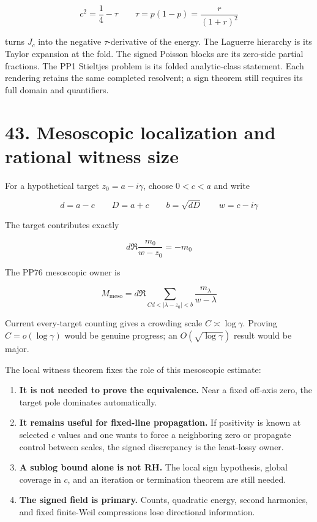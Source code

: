 \documentclass[
  11pt,
]{book}
\providecommand{\tightlist}{%
  \setlength{\itemsep}{0pt}\setlength{\parskip}{0pt}}
\begin{document}
\[
c^2=\frac14-\tau
\qquad
\tau=p(1-p)=\frac{r}{(1+r)^2}
\]

turns \(J_c\) into the negative \(\tau\)-derivative of the energy. The
Laguerre hierarchy is its Taylor expansion at the fold. The signed
Poisson blocks are its zero-side partial fractions. The PP1 Stieltjes
problem is its folded analytic-class statement. Each rendering retains
the same completed resolvent; a sign theorem still requires its full
domain and quantifiers.

\section{43. Mesoscopic localization and rational witness
size}\label{mesoscopic-localization-and-rational-witness-size}

For a hypothetical target \(z_0=a-i\gamma\), choose \(0<c<a\) and write

\[
d=a-c
\qquad
D=a+c
\qquad
b=\sqrt{dD}
\qquad
w=c-i\gamma
\]

The target contributes exactly

\[
d\Re\frac{m_0}{w-z_0}=-m_0
\]

The PP76 mesoscopic owner is

\[
M_{\mathrm{meso}}
=d\Re\sum_{Cd<|\lambda-z_0|<b}
\frac{m_\lambda}{w-\lambda}
\]

Current every-target counting gives a crowding scale
\(C\asymp\log\gamma\). Proving \(C=o(\log\gamma)\) would be genuine
progress; an \(O(\sqrt{\log\gamma})\) result would be major.

The local witness theorem fixes the role of this mesoscopic estimate:

\begin{enumerate}
\def\labelenumi{\arabic{enumi}.}
\tightlist
\item
  \textbf{It is not needed to prove the equivalence.} Near a fixed
  off-axis zero, the target pole dominates automatically.
\item
  \textbf{It remains useful for fixed-line propagation.} If positivity
  is known at selected \(c\) values and one wants to force a neighboring
  zero or propagate control between scales, the signed discrepancy is
  the least-lossy owner.
\item
  \textbf{A sublog bound alone is not RH.} The local sign hypothesis,
  global coverage in \(c\), and an iteration or termination theorem are
  still needed.
\item
  \textbf{The signed field is primary.} Counts, quadratic energy, second
  harmonics, and fixed finite-Weil compressions lose directional
  information.
\end{enumerate}
\end{document}
